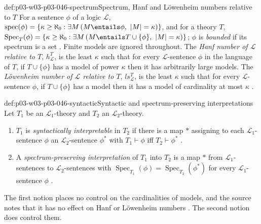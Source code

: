 \begin{hbdefinition}{def:p03-w03-p03-046-spectrum}{Spectrum, Hanf and L\"owenheim numbers relative to \(T\)}
For a sentence \(\phi\) of a logic \(\mathscr L\),
\(\operatorname{spec}(\phi)=\{\kappa\ge\aleph_0:\exists M\,(M\entails\phi,\
|M|=\kappa)\}\), and for a theory \(T\),
\(\operatorname{Spec}_T(\phi)=\{\kappa\ge\aleph_0:\exists M\,(M\entails
T\cup\{\phi\},\ |M|=\kappa)\}\); \(\phi\) is \emph{bounded} if its spectrum
is a set \cite[p.~234, Notation~1.3.1]{BaldwinShelah1985}. Finite models
are ignored throughout. The \emph{Hanf number of \(\mathscr L\) relative to
\(T\)}, \(h^T_{\mathscr L}\), is the least \(\kappa\) such that for every
\(\mathscr L\)-sentence \(\phi\) in the language of \(T\), if
\(T\cup\{\phi\}\) has a model of power \(\kappa\) then it has arbitrarily
large models. The \emph{L\"owenheim number of \(\mathscr L\) relative to
\(T\)}, \(ls^T_{\mathscr L}\), is the least \(\kappa\) such that for every
\(\mathscr L\)-sentence \(\phi\), if \(T\cup\{\phi\}\) has a model then it
has a model of cardinality at most \(\kappa\)
\cite[p.~235, Definition~1.3.2]{BaldwinShelah1985}.
\end{hbdefinition}

\begin{hbdefinition}{def:p03-w03-p03-046-syntactic}{Syntactic and spectrum-preserving interpretations}
Let \(T_1\) be an \(\mathscr L_1\)-theory and \(T_2\) an
\(\mathscr L_2\)-theory.
\begin{enumerate}
  \item \(T_1\) is \emph{syntactically interpretable} in \(T_2\) if there
        is a map \(*\) assigning to each \(\mathscr L_1\)-sentence \(\phi\)
        an \(\mathscr L_2\)-sentence \(\phi^*\) with \(T_1\vdash\phi\) iff
        \(T_2\vdash\phi^*\) \cite[p.~237, Definition~1.4.1]{BaldwinShelah1985}.
  \item A \emph{spectrum-preserving interpretation} of \(T_1\) into \(T_2\)
        is a map \(*\) from \(\mathscr L_1\)-sentences to
        \(\mathscr L_2\)-sentences with
        \(\operatorname{Spec}_{T_1}(\phi)=\operatorname{Spec}_{T_2}(\phi^*)\)
        for every \(\mathscr L_1\)-sentence \(\phi\)
        \cite[p.~237, Definition~1.4.2]{BaldwinShelah1985}.
\end{enumerate}
\end{hbdefinition}

The first notion places no control on the cardinalities of models, and the
source notes that it has no effect on Hanf or L\"owenheim numbers
\cite[p.~237]{BaldwinShelah1985}. The second notion does control them.

